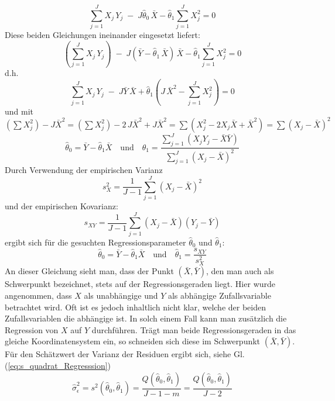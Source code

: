 \[
\sum\limits_{j = 1}^J {X_j \, Y_j \; - \; J \hat{\theta}_0 \, \bar {X}} - \hat{\theta}_1 \sum\limits_{j = 1}^J {X_j ^2 = 0}
\]
Diese beiden Gleichungen ineinander eingesetzt liefert:
\[
\left(\sum\limits_{j = 1}^J X_j \, Y_j\right) \; - 
\; J (\bar {Y} - \hat{\theta}_1 \, \bar {X}) \, \bar {X} - \hat{\theta}_1 \sum\limits_{j = 1}^J {X_j ^2 = 0}
\]
d.h.
\[
\sum\limits_{j = 1}^J X_j \, Y_j \; - \; J \bar {Y} \, \bar {X} + 
\hat{\theta}_1\left( J \, \bar {X}^2 - \sum\limits_{j = 1}^J X_j ^2 \right) = 0
\]
und mit $(\sum X_j^2) - J \bar X^2 = (\sum X_j^2) - 2 \, J \bar X^2  + J \bar X^2 = 
\sum(X_j^2 - 2 X_j \bar X  + \bar X^2) = \sum(X_j - \bar X)^2$
\[
\hat{\theta}_0 = \bar {Y} - \hat{\theta}_1 \bar {X} \quad \mathrm{und} \quad
\hat{\theta}_1 = \frac{\sum\limits_{j =
		1}^J {(X_j Y_j - \bar {X}\bar {Y})} }
{\sum\limits_{j = 1}^J {(X_j
		- \bar {X})^2} }
\]
Durch Verwendung der empirischen Varianz
\[
s_X^2 = \frac{1}{J - 1}\sum\limits_{j = 1}^J {(X_j - \bar {X})^2}
\]
\noindent und der empirischen Kovarianz:
\[
s_{XY} = \frac{1}{J - 1}\sum\limits_{j = 1}^J {(X_j - \bar
	{X})(Y_j - \bar {Y})}
\]
\noindent ergibt sich für die gesuchten Regressionsparameter
$\hat{\theta}_0$ und $\hat{\theta}_1 $:
\begin{equation}
\hat{\theta}_0 = \bar {Y} - \hat{\theta}_1 \bar {X} \quad \mathrm{und} \quad
\hat{\theta}_1 = \frac{s_{XY} }{s_X^2 }
\label{eq:Lineare_Regressionskonstanten}
\end{equation}
An dieser Gleichung sieht man, dass der Punkt $(\bar {X},\bar
{Y})$, den man auch als Schwerpunkt bezeichnet, stets auf der
Regressionsgeraden liegt. Hier wurde angenommen, dass $X$
als unabhängige und $Y $ als abhängige
Zufallsvariable betrachtet wird. Oft ist es jedoch inhaltlich
nicht klar, welche der beiden Zufallsvariablen die abh\"{a}ngige
ist. In solch einem Fall kann man zusätzlich die Regression
von $X$ auf $Y$ durchführen. Trägt man beide
Regressionsgeraden in das gleiche Koordinatensystem ein, so
schneiden sich diese im Schwerpunkt $(\bar {X},\bar {Y})$.
Für den Schätzwert der Varianz der Residuen ergibt sich, siehe Gl.(\ref{eq:s_quadrat_Regresssion})
\begin{equation}
\hat\sigma_\epsilon^2 = s^2(\hat{\theta}_0 ,\hat{\theta}_1 ) = \frac{Q(\hat{\theta}_0 ,
	\hat{\theta}_1 )}{J - 1 - m } 
= \frac{Q(\hat{\theta}_0 ,
	\hat{\theta}_1 )}{J - 2}
\end{equation}

\newpage
